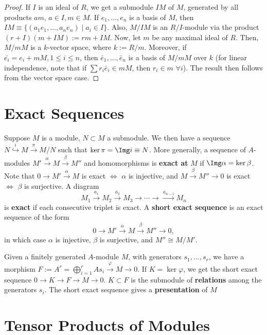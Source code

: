 \begin{proof}
    If $I$ is an ideal of $R$, we get a submodule $IM$ of $M$, generated by all products $am$, $a \in I,m \in M$. If $e_1,\dots,e_n$ is a basis of $M$, then $IM \equiv \{ (a_1e_1,\dots,a_ne_n) \mid a_i \in I\}$. Also, $M/IM$ is an $R/I$-module via the product $(r+I)(m+IM):= rm+IM$. Now, let $m$ be any maximal ideal of $R$. Then, $M / mM$ is a $k$-vector space, where $k:= R/m$. Moreover, if $\bar {e_i}=e_i+mM,1 \leq i \leq n$, then $\bar e_1,\dots,\bar e_n$ is a basis of $M/mM$ over $k$ (for linear independence, note that if $\sum r_i\bar e_i \in mM$, then $r_i \in m$ $\forall i$). The result then follows from the vector space case.
\end{proof}

\section{Exact Sequences}
\begin{defn}
    Suppose $M$ is a module, $N \subset M$ a submodule. We then have a sequence $N \overset{i}{\hookrightarrow} M \overset{\pi}{\to} M/N$ such that $\ker \pi = \Img i \equiv N$. More generally, a sequence of $A$-modules $M' \overset{\alpha}{\to}M \overset{\beta}{\to}M''$ and homomorphisms is \textbf{exact at} $M$ if $\Img \alpha = \ker \beta$. Note that $0 \to M' \overset{\alpha}{\to} M$ is exact $\iff$ $\alpha$ is injective, and $M \overset{\beta}{\to}M''\to 0$ is exact $\iff$ $\beta$ is surjective. A diagram
    $$M_1 \overset{a_1}{\to}M_2 \overset{a_2}{\to}M_3\to \cdots \to \overset{a_{n-1}}{\to} M_n$$
    is \textbf{exact} if each consecutive triplet is exact. A \textbf{short exact sequence} is an exact sequence of the form
    $$0 \to M' \overset{\alpha}{\to}M \overset{\beta}{\to}M'' \to 0,$$
    in which case $\alpha$ is injective, $\beta$ is surjective, and $M'' \cong M/M'$.
\end{defn}

\begin{ex}
    Given a finitely generated $A$-module $M$, with generators $s_1,\dots,s_r$, we have a morphism $F:= A^r = \bigoplus_{i=1}^rAs_i \overset{\varphi}{\to}M \to 0$. If $K = \ker \varphi$, we get the short exact sequence $0 \to K \to F \to M \to 0$. $K \subset F$ is the submodule of \textbf{relations} among the generators $s_i$. The short exact sequence gives a \textbf{presentation} of $M$
\end{ex}

\section{Tensor Products of Modules}

